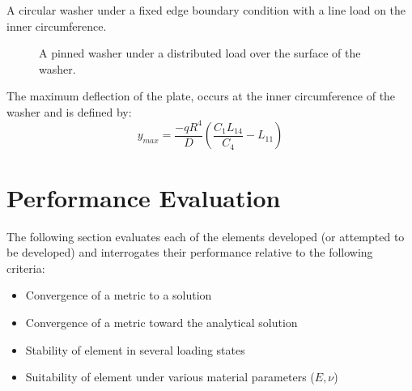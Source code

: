 \documentclass[10pt,letterpaper]{report}
\numberwithin{equation}{chapter}
\begin{document}
\subsection{}
\label{subsec:fwd} %
A circular washer under a fixed edge boundary condition with a line load on the inner circumference.
\begin{figure}[!ht]
\centering
\label{fig:fwd}
    \hfill
    \caption{A pinned washer under a distributed load over the surface of the washer.}
    \label{fig:dummy}
\end{figure}
The maximum deflection of the plate, occurs at the inner circumference of the washer and is defined by:
\[y_{max}=\frac{-q R^4}{D}\left(\frac{C_1 L_{14}}{C_4} - L_{11}\right)\]





\chapter{Performance Evaluation}
The following section evaluates each of the elements developed (or attempted to be developed) and interrogates their performance relative to the following criteria:
\begin{itemize}
\item Convergence of a metric to a solution
\item Convergence of a metric toward the analytical solution
\item Stability of element in several loading states
\item Suitability of element under various material parameters ($E,\nu$)
\end{itemize}
\end{document}

